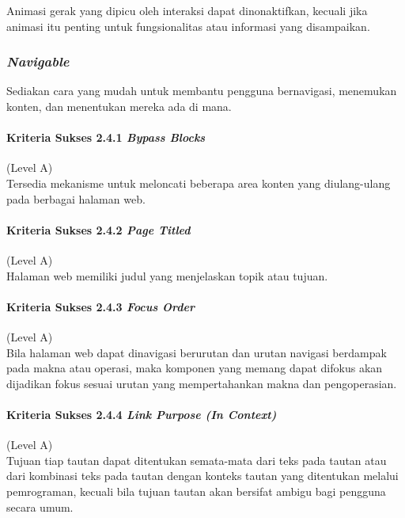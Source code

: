 Animasi gerak yang dipicu oleh interaksi dapat dinonaktifkan, kecuali jika animasi itu penting untuk fungsionalitas atau informasi yang disampaikan.

\subsubsection{\textit{Navigable}}
\label{sec:navigable}
Sediakan cara yang mudah untuk membantu pengguna bernavigasi, menemukan konten, dan menentukan mereka ada di mana.

\paragraph{Kriteria Sukses 2.4.1 \textit{Bypass Blocks}}
\label{sec:kriteria_sukses_2.4.1}
(Level A)\\

Tersedia mekanisme untuk meloncati beberapa area konten yang diulang-ulang pada berbagai halaman web.

\paragraph{Kriteria Sukses 2.4.2 \textit{Page Titled}}
\label{sec:kriteria_sukses_2.4.2}
(Level A)\\

Halaman web memiliki judul yang menjelaskan topik atau tujuan.

\paragraph{Kriteria Sukses 2.4.3 \textit{Focus Order}}
\label{sec:kriteria_sukses_2.4.3}
(Level A)\\

Bila halaman web dapat dinavigasi berurutan dan urutan navigasi berdampak pada makna atau operasi, maka komponen yang memang dapat difokus akan dijadikan fokus sesuai urutan yang mempertahankan makna dan pengoperasian.

\paragraph{Kriteria Sukses 2.4.4 \textit{Link Purpose (In Context)}}
\label{sec:kriteria_sukses_2.4.4}
(Level A)\\

Tujuan tiap tautan dapat ditentukan semata-mata dari teks pada tautan atau dari kombinasi teks pada tautan dengan konteks tautan yang ditentukan melalui pemrograman, kecuali bila tujuan tautan akan bersifat ambigu bagi pengguna secara umum.

